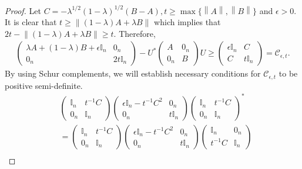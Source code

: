 \documentclass[12pt,a4paper]{amsart}
\theoremstyle{definition}
\newcommand{\mynorm}[1]{ \left\| #1 \right\| }
\begin{document}
\begin{proof}
		Let $C = -\lambda^{1/2}(1-\lambda)^{1/2}(B-A), t \geq \max \lbrace \mynorm{A}, \mynorm{B} \rbrace$ and $\epsilon > 0$. It is clear that $t \geq \mynorm{(1-\lambda)A + \lambda B}$ which implies that $2t - \mynorm{(1-\lambda)A + \lambda B} \geq t$. Therefore, 
		\begin{align*}
			\begin{pmatrix}
				\lambda A + (1-\lambda)B + \epsilon \mathbb{I}_n &  0_n\\
				0_n & 2t \mathbb{I}_n
			\end{pmatrix} - U^{*} 	
			\begin{pmatrix}
				A &   0_n \\
				0_n & B
			\end{pmatrix}  U \geq 
			\begin{pmatrix}
				\epsilon \mathbb{I}_n  &  C  \\
				C & t \mathbb{I}_n
			\end{pmatrix} = \mathcal{C}_{\epsilon, t}.
		\end{align*}
		By using Schur complements, we will establish necessary conditions for $\mathcal{C}_{\epsilon, t}$ to be positive semi-definite.
		\begin{align*}
			&\begin{pmatrix}
				\mathbb{I}_n  &  t^{-1}C  \\
				0_n & \mathbb{I}_n
			\end{pmatrix} 
			\begin{pmatrix}
				\epsilon\mathbb{I}_n - t^{-1}C^{2} &  0_n \\
				0_n & t \mathbb{I}_n
			\end{pmatrix} 
			\begin{pmatrix}
				\mathbb{I}_n &  t^{-1}C \\
				0_n  & \mathbb{I}_n
			\end{pmatrix}^{*} \\
			& = 
			\begin{pmatrix}
				\mathbb{I}_n  &  t^{-1}C  \\
				0_n & \mathbb{I}_n
			\end{pmatrix} 
			\begin{pmatrix}
				\epsilon\mathbb{I}_n - t^{-1}C^{2} &  0_n \\
				0_n & t \mathbb{I}_n
			\end{pmatrix} 
			\begin{pmatrix}
				\mathbb{I}_n &  0_n \\
				t^{-1}C & \mathbb{I}_n
			\end{pmatrix} \\

\end{align*}
\end{proof}
\end{document}
